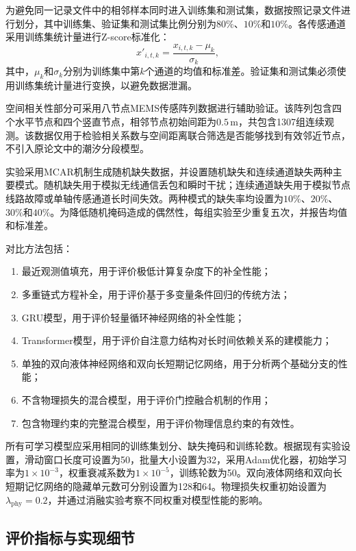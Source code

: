 为避免同一记录文件中的相邻样本同时进入训练集和测试集，数据按照记录文件进行划分，其中训练集、验证集和测试集比例分别为$80\%$、$10\%$和$10\%$。各传感通道采用训练集统计量进行Z-score标准化：
\begin{equation}
    x'_{i,t,k}
    =
    \frac{
    x_{i,t,k}-\mu_k
    }{\sigma_k},
\end{equation}
其中，$\mu_k$和$\sigma_k$分别为训练集中第$k$个通道的均值和标准差。验证集和测试集必须使用训练集统计量进行变换，以避免数据泄漏。

空间相关性部分可采用八节点MEMS传感阵列数据进行辅助验证。该阵列包含四个水平节点和四个竖直节点，相邻节点初始间距为$0.5\,\mathrm{m}$，共包含1307组连续观测\cite{ge2024spatiotemporal}。该数据仅用于检验相关系数与空间距离联合筛选是否能够找到有效邻近节点，不引入原论文中的潮汐分段模型。

实验采用MCAR机制生成随机缺失数据，并设置随机缺失和连续通道缺失两种主要模式。随机缺失用于模拟无线通信丢包和瞬时干扰；连续通道缺失用于模拟节点线路故障或单轴传感通道长时间失效。两种模式的缺失率均设置为$10\%$、$20\%$、$30\%$和$40\%$。为降低随机掩码造成的偶然性，每组实验至少重复五次，并报告均值和标准差。

对比方法包括：

\begin{enumerate}
    \item 最近观测值填充，用于评价极低计算复杂度下的补全性能；
    \item 多重链式方程补全，用于评价基于多变量条件回归的传统方法；
    \item GRU模型，用于评价轻量循环神经网络的补全性能；
    \item Transformer模型，用于评价自注意力结构对长时间依赖关系的建模能力；
    \item 单独的双向液体神经网络和双向长短期记忆网络，用于分析两个基础分支的性能；
    \item 不含物理损失的混合模型，用于评价门控融合机制的作用；
    \item 包含物理约束的完整混合模型，用于评价物理信息约束的有效性。
\end{enumerate}

所有可学习模型应采用相同的训练集划分、缺失掩码和训练轮数。根据现有实验设置，滑动窗口长度可设置为50，批量大小设置为32，采用Adam优化器，初始学习率为$1\times10^{-3}$，权重衰减系数为$1\times10^{-5}$，训练轮数为50。双向液体网络和双向长短期记忆网络的隐藏单元数可分别设置为128和64。物理损失权重初始设置为
$\lambda_{\mathrm{phy}}=0.2$，并通过消融实验考察不同权重对模型性能的影响。

\subsection{评价指标与实现细节}

